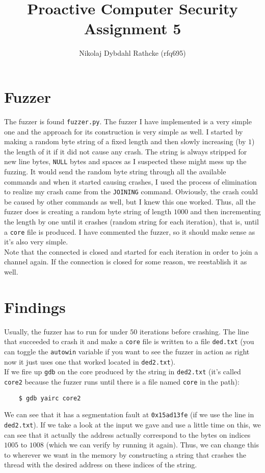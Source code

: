 \documentclass[a4paper]{article}
\author{Nikolaj Dybdahl Rathcke (rfq695)}
\title{Proactive Computer Security \\ Assignment 5}
\begin{document}
\maketitle

\section{Fuzzer}
The fuzzer is found \texttt{fuzzer.py}. The fuzzer I have implemented is a very simple one and the approach for its construction is very simple as well. I started by making a random byte string of a fixed length and then slowly increasing (by $1$) the length of it if it did not cause any crash. The string is always stripped for new line bytes, \texttt{NULL} bytes and spaces as I suspected these might mess up the fuzzing. It would send the random byte string through all the available commands and when it started causing crashes, I used the process of elimination to realize my crash came from the \texttt{JOINING} command. Obviously, the crash could be caused by other commands as well, but I knew this one worked. Thus, all the fuzzer does is creating a random byte string of length $1000$ and then incrementing the length by one until it crashes (random string for  each iteration), that is, until a \texttt{core} file is produced. I have commented the fuzzer, so it should make sense as it's also very simple. \\
Note that the connected is closed and started for each iteration in order to join a channel again. If the connection is closed for some reason, we reestablish it as well.

\section{Findings}
Usually, the fuzzer has to run for under $50$ iterations before crashing. The line that succeeded to crash it and make a \texttt{core} file is written to a file \texttt{ded.txt} (you can toggle the \texttt{autowin} variable if you want to see the fuzzer in action as right now it just uses one that worked located in \texttt{ded2.txt}). \\
If we fire up \texttt{gdb} on the core produced by the string in \texttt{ded2.txt} (it's called \texttt{core2} because the fuzzer runs until there is a file named \texttt{core} in the path):
\begin{verbatim}
    $ gdb yairc core2
\end{verbatim}
We can see that it has a segmentation fault at \texttt{0x15ad13fe} (if we use the line in \texttt{ded2.txt}). If we take a look at the input we gave and use a little time on this, we can see that it actually the address actually correspond to the bytes on indices $1005$ to $1008$ (which we can verify by running it again). Thus, we can change this to wherever we want in the memory by constructing a string that crashes the thread with the desired address on these indices of the string.
\end{document}
